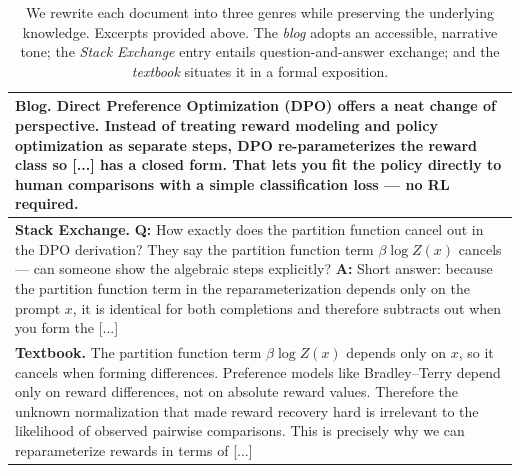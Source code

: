 \documentclass[11pt]{article}
\begin{document}
\begin{table}[t]
\centering
{\footnotesize
\begin{tabularx}{\linewidth}{@{} >{\raggedright\arraybackslash}X @{}}
\toprule
\textbf{Blog.} Direct Preference Optimization (DPO) offers a neat change of perspective. Instead of treating reward modeling and policy optimization as separate steps, DPO re-parameterizes the reward class so [...] has a closed form. That lets you fit the policy directly to human comparisons with a simple classification loss --- no RL required. \tabularnewline
\midrule
\textbf{Stack Exchange.} \textbf{Q:} How exactly does the partition function cancel out in the DPO derivation? They say the partition function term $\beta \log Z(x)$ cancels --- can someone show the algebraic steps explicitly? \textbf{A:} Short answer: because the partition function term in the reparameterization depends only on the prompt $x$, it is identical for both completions and therefore subtracts out when you form the [...]\tabularnewline
\midrule
\textbf{Textbook.} The partition function term $\beta\log Z(x)$ depends only on $x$, so it cancels when forming differences. Preference models like Bradley--Terry depend only on reward differences, not on absolute reward values. Therefore the unknown normalization that made reward recovery hard is irrelevant to the likelihood of observed pairwise comparisons. This is precisely why we can reparameterize rewards in terms of [...] \tabularnewline
\bottomrule
\end{tabularx}
}
\caption{\small{We rewrite each document into three genres while preserving the underlying knowledge. Excerpts provided above. The \textit{blog} adopts an accessible, narrative tone; the \textit{Stack Exchange} entry entails question-and-answer exchange; and the \textit{textbook} situates it in a formal exposition.}}
\label{tab1}
\vspace{-5mm}
\end{table}
\end{document}
